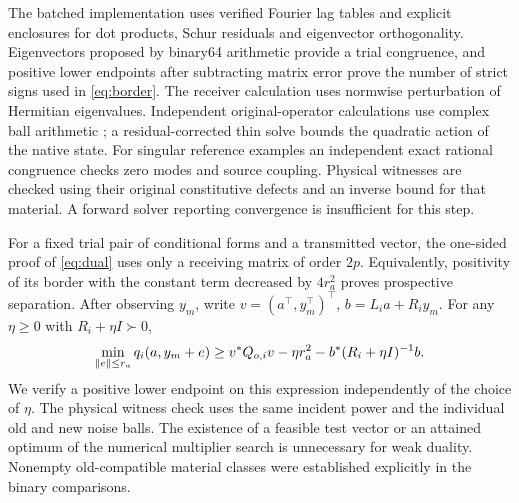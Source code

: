 The batched implementation uses verified Fourier lag tables and explicit enclosures for dot products, Schur residuals and eigenvector orthogonality. Eigenvectors proposed by binary64 arithmetic provide a trial congruence, and positive lower endpoints after subtracting matrix error prove the number of strict signs used in \eqref{eq:border}. The receiver calculation uses normwise perturbation of Hermitian eigenvalues. Independent original-operator calculations use complex ball arithmetic \cite{arb}; a residual-corrected thin solve bounds the quadratic action of the native state. For singular reference examples an independent exact rational congruence checks zero modes and source coupling. Physical witnesses are checked using their original constitutive defects and an inverse bound for that material. A forward solver reporting convergence is insufficient for this step.

For a fixed trial pair of conditional forms and a transmitted vector, the one-sided proof of \eqref{eq:dual} uses only a receiving matrix of order $2p$. Equivalently, positivity of its border with the constant term decreased by $4r_a^2$ proves prospective separation. After observing $y_m$, write $v=(a^\top,y_m^\top)^\top$, $b=L_i a+R_i y_m$. For any $\eta\geq0$ with $R_i+\eta I\succ0$,
\begin{equation}
 \min_{\|e\|\leq r_a} q_i(a,y_m+e)
 \geq v^{\ast} Q_{o,i}v-\eta r_a^2-b^{\ast}(R_i+\eta I)^{-1}b.     \label{eq:trust}
\end{equation}
We verify a positive lower endpoint on this expression independently of the choice of $\eta$. The physical witness check uses the same incident power and the individual old and new noise balls. The existence of a feasible test vector or an attained optimum of the numerical multiplier search is unnecessary for weak duality. Nonempty old-compatible material classes were established explicitly in the binary comparisons.

